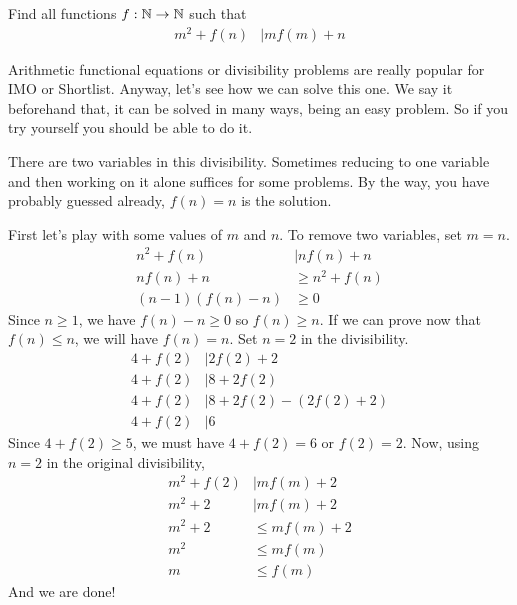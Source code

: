 \documentclass[problems.tex]{subfile}
\begin{document}
	\begin{problem}
		Find all functions $f:\mathbb{N}\to\mathbb{N}$ such that
		\begin{align*}
		m^2+f(n) & |mf(m)+n
		\end{align*}
	\end{problem}
	Arithmetic functional equations or divisibility problems are really popular for IMO or Shortlist. Anyway, let's see how we can solve this one. We say it beforehand that, it can be solved in many ways, being an easy problem. So if you try yourself you should be able to do it.
	\begin{solution}[First]
		There are two variables in this divisibility. Sometimes reducing to one variable and then working on it alone suffices for some problems. By the way, you have probably guessed already, $f(n)=n$ is the solution.
		
		First let's play with some values of $m$ and $n$. To remove two variables, set $m=n$.
			\begin{align*}
				n^2+f(n) & |nf(n)+n\\
				nf(n)+n &\geq n^2+f(n)\\
				(n-1)(f(n)-n)&\geq0 
			\end{align*}
		Since $n\geq1$, we have $f(n)-n\geq0$ so $f(n)\geq n$. If we can prove now that $f(n)\leq n$, we will have $f(n)=n$. Set $n=2$ in the divisibility.
			\begin{align*}
				4+f(2) & |2f(2)+2\\
				4+f(2) & |8+2f(2)\\
				4+f(2) & |8+2f(2)-(2f(2)+2)\\
				4+f(2) & |6
			\end{align*}
		Since $4+f(2)\geq 5$, we must have $4+f(2)=6$ or $f(2)=2$. Now, using $n=2$ in the original divisibility,
			\begin{align*}
				m^2+f(2) &|mf(m)+2\\
				m^2+2 &|mf(m)+2\\
				m^2+2 &\leq mf(m)+2\\
				m^2 &\leq mf(m)\\
				m &\leq f(m)
			\end{align*}
		And we are done!
	\end{solution}
	
\end{document}
